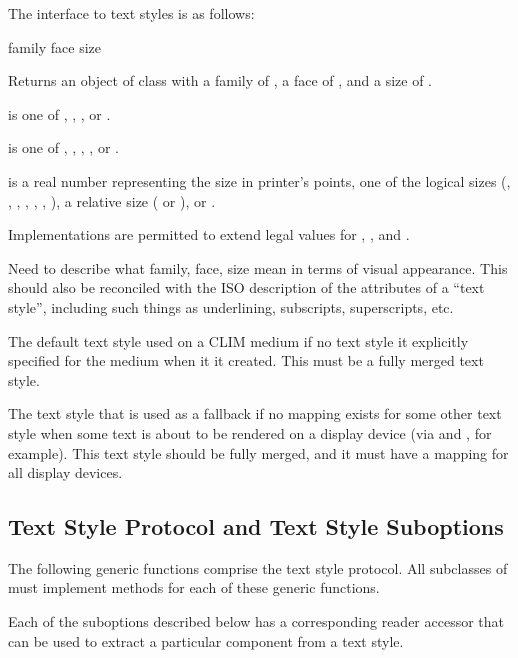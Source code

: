 The interface to text styles is as follows:

 {family face size}

Returns an object of class  with a family of
, a face of , and a size of .

 is one of , , , or .

 is one of , , , ,
or .

 is a real number representing the size in printer's points, one of
the logical sizes (, , , ,
, , ), a relative size ( or
), or .

Implementations are permitted to extend legal values for ,
, and .

 {Need to describe what family, face, size mean in terms of
visual appearance.  This should also be reconciled with the ISO description of
the attributes of a ``text style'', including such things as underlining,
subscripts, superscripts, etc.}


The default text style used on a CLIM medium if no text style it explicitly
specified for the medium when it it created.  This must be a fully merged text
style.


The text style that is used as a fallback if no mapping exists for some other
text style when some text is about to be rendered on a display device (via
 and , for example).  This text style should be fully
merged, and it must have a mapping for all display devices.


\subsection {Text Style Protocol and Text Style Suboptions}

The following generic functions comprise the text style protocol.  All
subclasses of  must implement methods for each of these generic
functions.

Each of the suboptions described below has a corresponding reader accessor that
can be used to extract a particular component from a text style.

